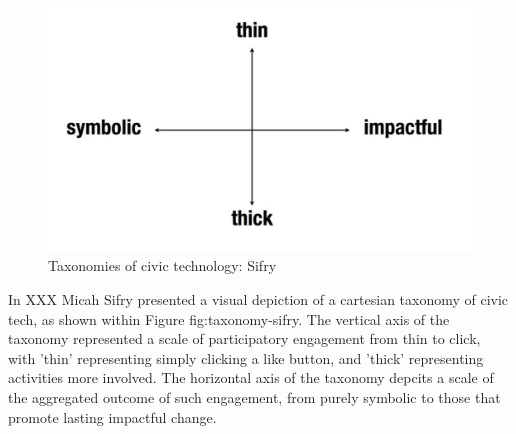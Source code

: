 \begin{figure}[h]
      \centering
      \includegraphics[scale=0.4]{images/taxonomy-sifry}
      \caption{Taxonomies of civic technology: Sifry}
      \label{fig:taxonomy-sifry}
\end{figure}

In XXX Micah Sifry presented a visual depiction of a cartesian taxonomy of civic tech, as shown within Figure {fig:taxonomy-sifry}.
The vertical axis of the taxonomy represented a scale of participatory engagement from thin to click,
with 'thin' representing simply clicking a like button,
and 'thick' representing activities more involved.
The horizontal axis of the taxonomy depcits a scale of the aggregated outcome of such engagement, 
from purely symbolic to those that promote lasting impactful change.
